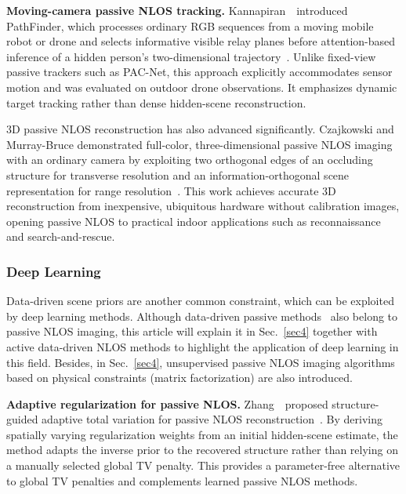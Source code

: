 \vspace{0.8mm}
\noindent \textbf{Moving-camera passive NLOS tracking.}
Kannapiran~\etal~introduced PathFinder, which processes ordinary RGB sequences from a moving mobile robot or drone and selects informative visible relay planes before attention-based inference of a hidden person's two-dimensional trajectory~\cite{kannapiranPathFinder2024}. Unlike fixed-view passive trackers such as PAC-Net, this approach explicitly accommodates sensor motion and was evaluated on outdoor drone observations. It emphasizes dynamic target tracking rather than dense hidden-scene reconstruction.

3D passive NLOS reconstruction has also advanced significantly. Czajkowski and Murray-Bruce demonstrated full-color, three-dimensional passive NLOS imaging with an ordinary camera by exploiting two orthogonal edges of an occluding structure for transverse resolution and an information-orthogonal scene representation for range resolution~\cite{czajkowskiTwoEdge2024}. This work achieves accurate 3D reconstruction from inexpensive, ubiquitous hardware without calibration images, opening passive NLOS to practical indoor applications such as reconnaissance and search-and-rescue.

\subsubsection{Deep Learning} \label{deepLearning}
Data-driven scene priors are another common constraint, which can be exploited by deep learning methods. Although data-driven passive methods~\cite{DBLP:journals/corr/abs-1810-11710,zhouNonlineofsightImagingPhong2020,yuNonLineofSightImagingDeep2019} also belong to passive NLOS imaging, this article will explain it in Sec.~\ref{sec4} together with active data-driven NLOS methods to highlight the application of deep learning in this field.
Besides, in Sec.~\ref{sec4}, unsupervised passive NLOS imaging algorithms~\cite{aittalaComputationalMirrorsBlind2019} based on physical constraints (matrix factorization) are also introduced.

\vspace{0.8mm}
\noindent \textbf{Adaptive regularization for passive NLOS.}
Zhang~\etal~proposed structure-guided adaptive total variation for passive NLOS reconstruction~\cite{zhangSGATVPassiveNLOS2026}. By deriving spatially varying regularization weights from an initial hidden-scene estimate, the method adapts the inverse prior to the recovered structure rather than relying on a manually selected global TV penalty. This provides a parameter-free alternative to global TV penalties and complements learned passive NLOS methods.

